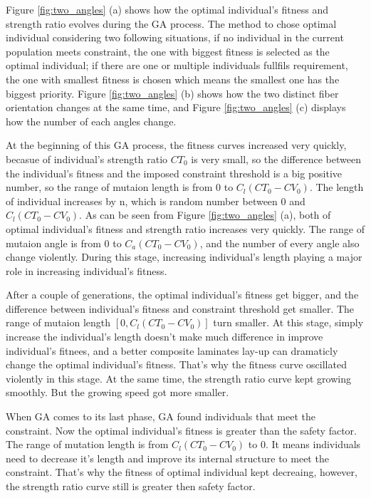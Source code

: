 Figure \ref{fig:two_angles} (a) shows how the optimal individual's fitness and
strength ratio evolves during the GA process. The method to chose optimal
individual considering two following situations, if no individual in the current
population meets constraint, the one with biggest fitness is selected as the
optimal individual; if there are one or multiple individuals fullfils
requirement, the one with smallest fitness is chosen which means the smallest
one has the biggest priority.  Figure \ref{fig:two_angles} (b) shows how the two
distinct fiber orientation changes at the same time, and Figure
\ref{fig:two_angles} (c) displays how the number of each angles change.

At the beginning of this GA process, the fitness curves increased very quickly,
becasue of individual's strength ratio $CT_0$ is very small, so the difference
between the individual's fitness and the imposed constraint threshold is a big
positive number, so the range of mutaion length is from 0 to $C_l(CT_0 - CV_0)$.
The length of individual increases by n, which is random number between 0 and
$C_l(CT_0 - CV_0)$. As can be seen from Figure \ref{fig:two_angles} (a), both of
optimal individual's fitness and strength ratio increases very quickly.  The
range of mutaion angle is from 0 to $C_a(CT_0 - CV_0)$, and the number of every
angle also change violently. During this stage, increasing individual's length
playing a major role in increasing individual's fitness.

After a couple of generations, the optimal individual's fitness get bigger, and
the difference between individual's fitness and constraint threshold get
smaller. The range of mutaion length $[0, C_l(CT_0 - CV_0)]$ turn smaller. At
this stage, simply increase the individual's length doesn't make much difference
in improve individual's fitnees, and a better composite laminates lay-up can
dramaticly change the optimal individual's fitness. That's why the fitness curve
oscillated violently in this stage.  At the same time, the strength ratio curve
kept growing smoothly. But the growing speed got more smaller.

When GA comes to its last phase, GA found individuals that meet the constraint.
Now the optimal individual's fitness is greater than the safety factor. The
range of mutation length is from $C_l(CT_0 - CV_0)$ to 0. It means individuals
need to decrease it's length and improve its internal structure to meet the
constraint. That's why the fitness of optimal individual kept decreaing,
however, the strength ratio curve still is greater then safety factor.

